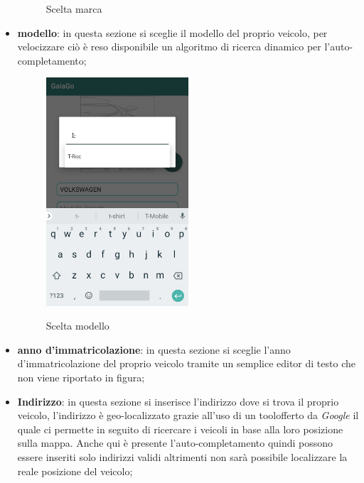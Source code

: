 \begin{itemize}
\begin{figure}[H]
	\caption{Scelta marca}
	\label{marca}
\end{figure}
\pagebreak
\item \textbf{modello}: in questa sezione si sceglie il modello del proprio veicolo, per velocizzare ciò è reso disponibile un algoritmo di ricerca dinamico per l'auto-completamento;
 \begin{figure}[H] 
	\centering 
	\includegraphics[width=0.5\textwidth]{res/images/modello_auto.png}\\
	\caption{Scelta modello}
	\label{modello}
\end{figure}
\item \textbf{anno d'immatricolazione}: in questa sezione si sceglie l'anno d'immatricolazione del proprio veicolo tramite un semplice editor di testo che non viene riportato in figura;
\pagebreak
\item \textbf{Indirizzo}: in questa sezione si inserisce l'indirizzo dove si trova il proprio veicolo, l'indirizzo è geo-localizzato grazie all'uso di un tool\glosp offerto da \textit{Google} il quale ci permette in seguito di ricercare i veicoli in base alla loro posizione sulla mappa. Anche qui è presente l'auto-completamento quindi possono essere inseriti solo indirizzi validi altrimenti non sarà possibile localizzare la reale posizione del veicolo;
 \begin{figure}[H] 
	\centering 

\end{figure}
\end{itemize}
